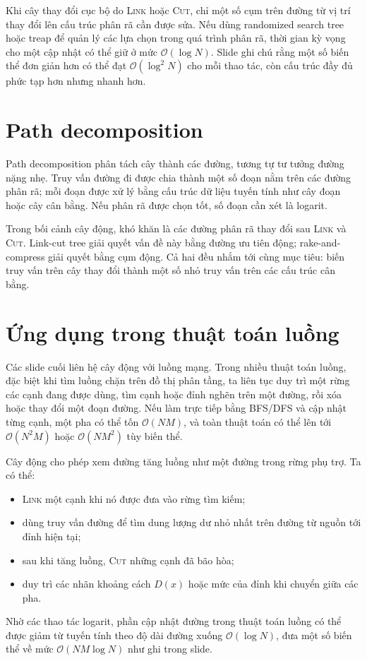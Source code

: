 \documentclass[11pt]{article}
\newcommand{\Oh}{\mathcal{O}}
\begin{document}
Khi cây thay đổi cục bộ do \textsc{Link} hoặc \textsc{Cut}, chỉ một số cụm
trên đường từ vị trí thay đổi lên cấu trúc phân rã cần được sửa. Nếu dùng
randomized search tree hoặc treap để quản lý các lựa chọn trong quá trình
phân rã, thời gian kỳ vọng cho một cập nhật có thể giữ ở mức \(\Oh(\log N)\).
Slide ghi chú rằng một số biến thể đơn giản hơn có thể đạt \(\Oh(\log^2 N)\)
cho mỗi thao tác, còn cấu trúc đầy đủ phức tạp hơn nhưng nhanh hơn.

\section{Path decomposition}

Path decomposition phân tách cây thành các đường, tương tự tư tưởng đường
nặng nhẹ. Truy vấn đường đi được chia thành một số đoạn nằm trên các đường
phân rã; mỗi đoạn được xử lý bằng cấu trúc dữ liệu tuyến tính như cây đoạn
hoặc cây cân bằng. Nếu phân rã được chọn tốt, số đoạn cần xét là logarit.

Trong bối cảnh cây động, khó khăn là các đường phân rã thay đổi sau
\textsc{Link} và \textsc{Cut}. Link-cut tree giải quyết vấn đề này bằng
đường ưu tiên động; rake-and-compress giải quyết bằng cụm động. Cả hai đều
nhắm tới cùng mục tiêu: biến truy vấn trên cây thay đổi thành một số nhỏ
truy vấn trên các cấu trúc cân bằng.

\section{Ứng dụng trong thuật toán luồng}

Các slide cuối liên hệ cây động với luồng mạng. Trong nhiều thuật toán luồng,
đặc biệt khi tìm luồng chặn trên đồ thị phân tầng, ta liên tục duy trì một
rừng các cạnh đang được dùng, tìm cạnh hoặc đỉnh nghẽn trên một đường, rồi
xóa hoặc thay đổi một đoạn đường. Nếu làm trực tiếp bằng BFS/DFS và cập nhật
từng cạnh, một pha có thể tốn \(\Oh(NM)\), và toàn thuật toán có thể lên tới
\(\Oh(N^2M)\) hoặc \(\Oh(NM^2)\) tùy biến thể.

Cây động cho phép xem đường tăng luồng như một đường trong rừng phụ trợ. Ta
có thể:
\begin{itemize}
  \item \textsc{Link} một cạnh khi nó được đưa vào rừng tìm kiếm;
  \item dùng truy vấn đường để tìm dung lượng dư nhỏ nhất trên đường từ nguồn
  tới đỉnh hiện tại;
  \item sau khi tăng luồng, \textsc{Cut} những cạnh đã bão hòa;
  \item duy trì các nhãn khoảng cách \(D(x)\) hoặc mức của đỉnh khi chuyển
  giữa các pha.
\end{itemize}
Nhờ các thao tác logarit, phần cập nhật đường trong thuật toán luồng có thể
được giảm từ tuyến tính theo độ dài đường xuống \(\Oh(\log N)\), đưa một số
biến thể về mức \(\Oh(NM\log N)\) như ghi trong slide.
\end{document}
